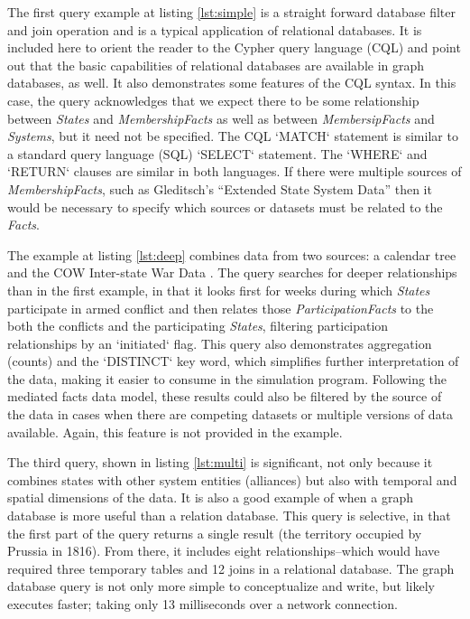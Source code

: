 \documentclass[runningheads]{llncs}
\begin{document}
The first query example at listing \ref{lst:simple} is a straight forward database filter and join operation and is a typical application of relational databases. 
It is included here to orient the reader to the Cypher query language (CQL) and point out that the basic capabilities of relational databases are available in graph databases, as well.
It also demonstrates some features of the CQL syntax. 
In this case, the query acknowledges that we expect there to be some relationship between \textit{States} and \textit{MembershipFacts} as well as between \textit{MembersipFacts} and \textit{Systems}, but it need not be specified.
The CQL `MATCH` statement is similar to a standard query language (SQL) `SELECT` statement.
The `WHERE` and `RETURN` clauses are similar in both languages.
If there were multiple sources of \textit{MembershipFacts}, such as Gleditsch's ``Extended State System Data'' \cite{Gleditsch2004} then it would be necessary to specify which sources or datasets must be related to the \textit{Facts}. 

The example at listing \ref{lst:deep} combines data from two sources: a calendar tree and the COW Inter-state War Data \cite{cow_war}.
The query searches for deeper relationships than in the first example, in that it looks first for weeks during which \textit{States} participate in armed conflict and then relates those \textit{ParticipationFacts} to the both the conflicts and the participating \textit{States}, filtering participation relationships by an `initiated` flag. 
This query also demonstrates aggregation (counts) and the `DISTINCT` key word, which simplifies further interpretation of the data, making it easier to consume in the simulation program.
Following the mediated facts data model, these results could also be filtered by the source of the data in cases when there are competing datasets or multiple versions of data available.
Again, this feature is not provided in the example.

The third query, shown in listing \ref{lst:multi} is significant, not only because it combines states with other system entities (alliances) but also with temporal and spatial dimensions of the data.
It is also a good example of when a graph database is more useful than a relation database. 
This query is selective, in that the first part of the query returns a single result (the territory occupied by Prussia in 1816).
From there, it includes eight relationships--which would have required three temporary tables and 12 joins in a relational database.
The graph database query is not only more simple to conceptualize and write, but likely executes faster; taking only 13 milliseconds over a network connection.
\end{document}
